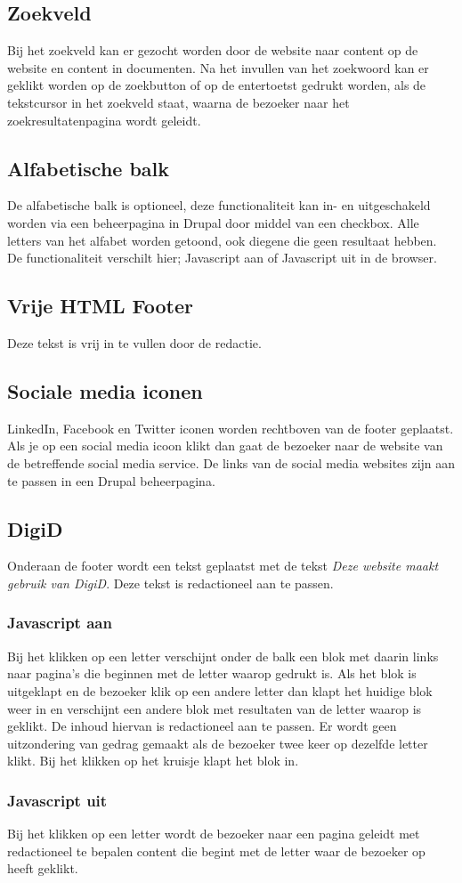 \subsection{Zoekveld}
\label{sec:zoekveld}
Bij het zoekveld kan er gezocht worden door de website naar content op de website en content in documenten. Na het invullen van het zoekwoord kan er geklikt worden op de zoekbutton of op de entertoetst gedrukt worden, als de tekstcursor in het zoekveld staat, waarna de bezoeker naar het zoekresultatenpagina wordt geleidt. 

\subsection{Alfabetische balk}
\label{sec:alfabetischebalk}
De alfabetische balk is optioneel, deze functionaliteit kan in- en uitgeschakeld worden via een beheerpagina in Drupal door middel van een checkbox. Alle letters van het alfabet worden getoond, ook diegene die geen resultaat hebben. De functionaliteit verschilt hier; Javascript aan of Javascript uit in de browser.

\subsection{Vrije HTML Footer}
\label{sec:vrijehtmlfooter}
Deze tekst is vrij in te vullen door de redactie.

\subsection{Sociale media iconen}
\label{sec:socialemediaiconen}
LinkedIn, Facebook en Twitter iconen worden rechtboven van de footer geplaatst. Als je op een social media icoon klikt dan gaat de bezoeker naar de website van de betreffende social media service. De links van de social media websites zijn aan te passen in een Drupal beheerpagina.

\subsection{DigiD}
\label{sec:digid}
Onderaan de footer wordt een tekst geplaatst met de tekst \emph{Deze website maakt gebruik van DigiD}. Deze tekst is redactioneel aan te passen.

\subsubsection{Javascript aan}
Bij het klikken op een letter verschijnt onder de balk een blok met daarin links naar pagina's die beginnen met de letter waarop gedrukt is. Als het blok is uitgeklapt en de bezoeker klik op een andere letter dan klapt het huidige blok weer in en verschijnt een andere blok met resultaten van de letter waarop is geklikt. De inhoud hiervan is redactioneel aan te passen. Er wordt geen uitzondering van gedrag gemaakt als de bezoeker twee keer op dezelfde letter klikt. Bij het klikken op het kruisje klapt het blok in.

\subsubsection{Javascript uit}
Bij het klikken op een letter wordt de bezoeker naar een pagina geleidt met redactioneel te bepalen content die begint met de letter waar de bezoeker op heeft geklikt.



